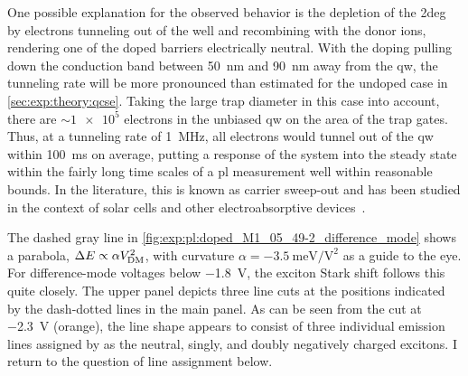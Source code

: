 One possible explanation for the observed behavior is the depletion of the \gls{2deg} by electrons tunneling out of the well and recombining with the donor ions, rendering one of the doped barriers electrically neutral.
With the doping pulling down the conduction band between \qty{50}{\nano\meter} and \qty{90}{\nano\meter} away from the \gls{qw}, the tunneling rate will be more pronounced than estimated for the undoped case in \cref{sec:exp:theory:qcse}.
Taking the large trap diameter in this case into account, there are $\sim\num{1e5}$ electrons in the unbiased \gls{qw} on the area of the trap gates.
Thus, at a tunneling rate of \qty{1}{\mega\hertz}, all electrons would tunnel out of the \gls{qw} within \qty{100}{\milli\second} on average, putting a response of the system into the steady state within the fairly long time scales of a \gls{pl} measurement
well within reasonable bounds.
In the literature, this is known as carrier sweep-out and has been studied in the context of solar cells and other electroabsorptive devices~\cite{Larsson1988,Schneider1988,Fox1991}.

The dashed gray line in \cref{fig:exp:pl:doped_M1_05_49-2_difference_mode} shows a parabola, $\Delta E\propto \alpha V_{\mathrm{DM}}^2$, with curvature $\alpha = \qty{-3.5}{\milli\electronvolt\per\volt\squared}$ as a guide to the eye.
For difference-mode voltages below \qty{-1.8}{\volt}, the exciton Stark shift follows this quite closely.
The upper panel depicts three line cuts at the positions indicated by the dash-dotted lines in the main panel.
As can be seen from the cut at \qty{-2.3}{\volt} (orange), the line shape appears to consist of three individual emission lines assigned by \citet{Descamps2021} as the neutral, singly, and doubly negatively charged excitons. %
I return to the question of line assignment below.

